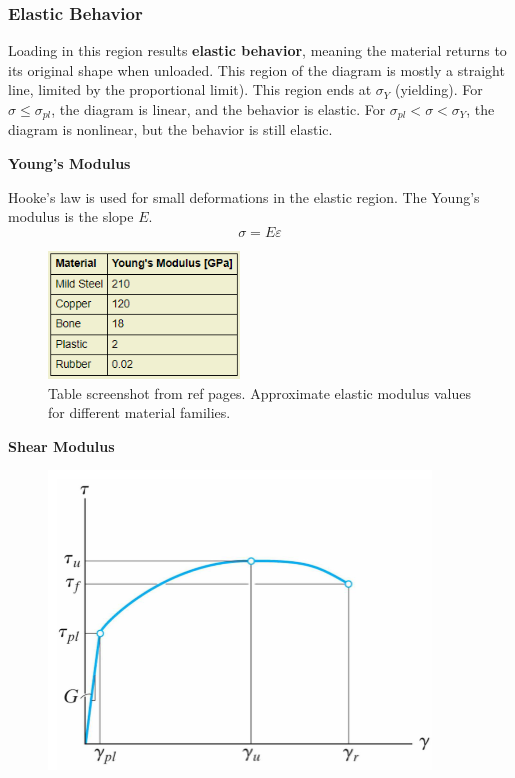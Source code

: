\subsubsection{Elastic Behavior}
Loading in this region results \textbf{elastic behavior}, meaning the material returns to its original shape when unloaded. This region of the diagram is mostly a straight line, limited by the proportional limit). This region ends at $\sigma_Y$ (yielding). For $\sigma \le \sigma_{pl}$, the diagram is linear, and the behavior is elastic. For $\sigma_{pl} < \sigma < \sigma_Y$, the diagram is nonlinear, but the behavior is still elastic.

\vspace{3mm}
\noindent \textbf{Young's Modulus}

\vspace{5pt}

\noindent Hooke's law is used for small deformations in the elastic region. The Young's modulus is the slope $E$.
\[\sigma = E\varepsilon\]

\begin{figure}[!h]
\centering
\includegraphics[angle=0, width=2in]{Material Properties-Figures/Modulus Examples.png}
\vspace{-2mm}
\caption{\small Table screenshot from ref pages. Approximate elastic modulus values for different material families.}
\vspace{-3mm}
\label{Fig:ModulusExamples}
\end{figure}

\vspace{3mm}
\noindent\textbf{Shear Modulus}
\vspace{1mm}
\begin{figure}[!h]
\centering
\includegraphics[angle=0, width=4in]{Material Properties-Figures/Shear Diagram.png}
\vspace{-2mm}
\caption{\small {}}
\vspace{-3mm}
\label{Fig:ShearDiagram}
\end{figure}

